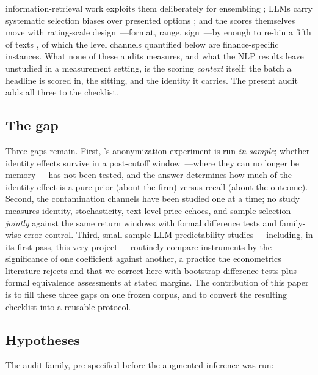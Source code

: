 information-retrieval work exploits them deliberately for ensembling \citep{korikov2025}; LLMs carry systematic selection biases over presented options \citep{zheng2024}; and the scores themselves move with rating-scale design~---format, range, sign~---by enough to re-bin a fifth of texts \citep{jo2026}, of which the level channels quantified below are finance-specific instances. What none of these audits measures, and what the NLP results leave unstudied in a measurement setting, is the scoring \emph{context} itself: the batch a headline is scored in, the sitting, and the identity it carries. The present audit adds all three to the checklist.

\subsection{The gap}

Three gaps remain. First, \citet{glasserman2023}'s anonymization experiment is run \emph{in-sample}; whether identity effects survive in a post-cutoff window~---where they can no longer be memory~---has not been tested, and the answer determines how much of the identity effect is a pure prior (about the firm) versus recall (about the outcome). Second, the contamination channels have been studied one at a time; no study measures identity, stochasticity, text-level price echoes, and sample selection \emph{jointly} against the same return windows with formal difference tests and family-wise error control. Third, small-sample LLM predictability studies~---including, in its first pass, this very project~---routinely compare instruments by the significance of one coefficient against another, a practice the econometrics literature rejects \citep[e.g.,][]{romano2005} and that we correct here with bootstrap difference tests plus formal equivalence assessments at stated margins. The contribution of this paper is to fill these three gaps on one frozen corpus, and to convert the resulting checklist into a reusable protocol.

\subsection{Hypotheses}

The audit family, pre-specified before the augmented inference was run:

